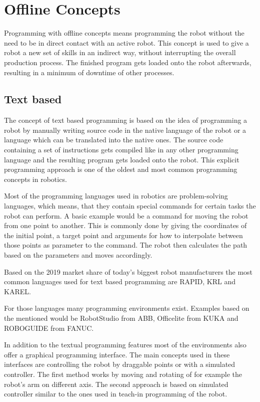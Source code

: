 \documentclass[conference]{IEEEtran}
\begin{document}
\section{Offline Concepts}

    Programming with offline concepts means programming the robot without the need to be in direct contact with an active robot. This concept is used to give a robot a new set of skills in an indirect way, without interrupting the overall production process.
    The finished program gets loaded onto the robot afterwards, resulting in a minimum of downtime of other processes. \cite[p. 186]{b4}

    \subsection{Text based}

        The concept of text based programming is based on the idea of programming a robot by manually writing source code in the native language of the robot or a language which can be translated into the native ones. The source code containing a set of instructions gets compiled like in any other programming language and the resulting program gets loaded onto the robot. %
        This explicit programming approach is one of the oldest and most common programming concepts in robotics. %

        Most of the programming languages used in robotics are problem-solving languages, which means, that they contain special commands for certain tasks the robot can perform. A basic example would be a command for moving the robot from one point to another. This is commonly done by giving the coordinates of the initial point, a target point and arguments for how to interpolate between those points as parameter to the command. 
        The robot then calculates the path based on the parameters and moves accordingly. %
               
        Based on the 2019 market share of today's biggest robot manufacturers the most common languages used for text based programming are RAPID, KRL and KAREL. \cite{s1}

        For those languages many programming environments exist. Examples based on the mentioned would be RobotStudio from ABB, Officelite from KUKA and ROBOGUIDE from FANUC.

        In addition to the textual programming features most of the environments also offer a graphical programming interface.
        The main concepts used in these interfaces are controlling the robot by draggable points or with a simulated controller.
        The first method works by moving and rotating of for example the robot's arm on different axis. 
        The second approach is based on simulated controller similar to the ones used in teach-in programming of the robot.
\end{document}
